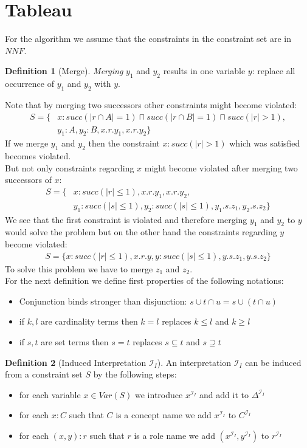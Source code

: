 \documentclass[a4paper,11pt]{scrartcl}
\theoremstyle{break}
\theoremstyle{definition}
\newtheorem{mydef}{Definition}
\begin{document}
\section{Tableau}
For the algorithm we assume that the constraints in the constraint set are in $NNF$.
\begin{mydef}[Merge]
\textit{Merging} $y_1$ and $y_2$ results in one variable $y$: replace all occurrence of $y_1$ and $y_2$ with $y$. 
\end{mydef}
Note that by merging two successors other constraints might become violated:
\begin{align}
S=\{&x:succ(|r\cap A|=1)\sqcap succ(|r\cap B|=1)\sqcap succ(|r|>1),\nonumber\\ &y_1:A, y_2:B, x.r.y_1, x.r.y_2\}
\end{align}
If we merge $y_1$ and $y_2$ then the constraint $x:succ(|r|>1)$ which was satisfied becomes violated.\\
But not only constraints regarding $x$ might become violated after merging two successors of $x$: 
\begin{align}
S=\{&x:succ(|r|\leq 1), x.r.y_1, x.r.y_2,\nonumber
\\&y_1:succ(|s|\leq 1), y_2:succ(|s|\leq 1), y_1.s.z_1, y_2.s.z_2\}
\end{align}
We see that the first constraint is violated and therefore merging $y_1$ and $y_2$ to $y$ would solve the problem but on the other hand the constraints regarding $y$ become violated: 
\begin{align*}
S=\{x:succ(|r|\leq 1), x.r.y,
y:succ(|s|\leq 1), y.s.z_1, y.s.z_2\}
\end{align*}
To solve this problem we have to merge $z_1$ and $z_2$.\\
For the next definition we define first properties of the following notations:
\begin{itemize}
\item Conjunction binds stronger than disjunction: $s\cup t\cap u = s\cup (t\cap u)$
\item if $k,l$ are cardinality terms then $k=l$ replaces $k\leq l$ and $k\geq l$ 
\item if $s,t$ are set terms then $s=t$ replaces $s\subseteq t$ and $s\supseteq t$
\end{itemize}
\begin{mydef}[Induced Interpretation $\mathcal{I}_I$]
An interpretation $\mathcal{I}_I$ can be induced from a constraint set $S$ by the following steps:
\begin{itemize}
\item for each variable $x\in Var(S)$ we introduce $x^{\mathcal{I}_I}$ and add it to $\Delta^{\mathcal{I}_I}$
\item for each $x:C$ such that $C$ is a concept name we add $x^{\mathcal{I}_I}$ to $C^{\mathcal{I}_I}$
\item for each $(x,y):r$ such that $r$ is a role name we add $(x^{\mathcal{I}_I},y^{\mathcal{I}_I})$ to $r^{\mathcal{I}_I}$
\end{itemize}
\end{mydef}
\end{document}
